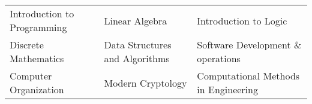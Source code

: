 
    


{\fontsize{10pt}{1.05em}
\selectfont
\begin{tabular}{l l l}

Introduction to Programming &  Linear Algebra & Introduction to Logic\\
Discrete Mathematics & Data Structures and Algorithms & Software Development \& operations \\
Computer Organization & Modern Cryptology & Computational Methods in Engineering \\

\end{tabular}
}\\
